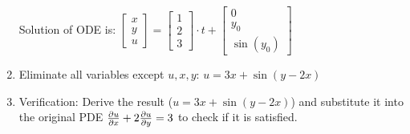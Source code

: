 \begin{enumerate}
	Solution of ODE is: $\begin{bmatrix}x\\y\\u\end{bmatrix}=\begin{bmatrix}1\\2\\3\end{bmatrix}\cdot t+ \begin{bmatrix}0\\y_0\\\sin(y_0)\end{bmatrix}$\\

	\item Eliminate all variables except $u,x,y$: $u=3x+\sin(y-2x)$
	\item Verification:
	Derive the result ($u=3x+\sin(y-2x)$) and substitute it into the original PDE $\frac{\partial u}{\partial x}+2\frac{\partial u}{\partial y}=3$ to check if it is satisfied.

\end{enumerate}
